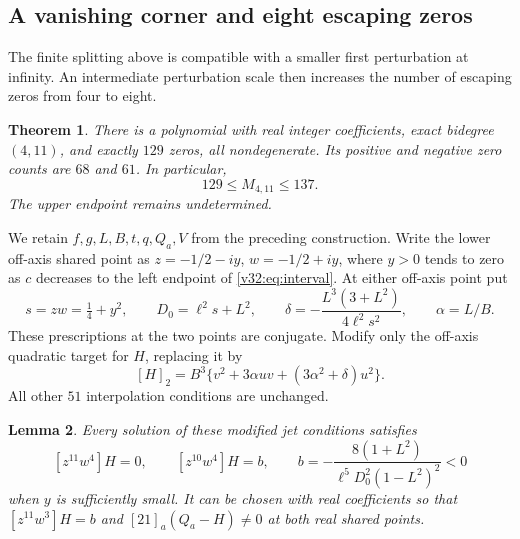 \documentclass[UTF8,11pt]{ctexart}
\newtheorem{thm}{Theorem}[section]
\newtheorem{lem}[thm]{Lemma}
\theoremstyle{definition}
\numberwithin{equation}{section}
\begin{document}
\subsection{A vanishing corner and eight escaping zeros}
\label{v33:sec:129}

The finite splitting above is compatible with a smaller first
perturbation at infinity. An intermediate perturbation scale then
increases the number of escaping zeros from four to eight.

\begin{thm}\label{v33:thm:129}
There is a polynomial with real integer coefficients, exact
bidegree $(4,11)$, and exactly $129$ zeros, all nondegenerate.
Its positive and negative zero counts are $68$ and $61$.
In particular,
\begin{equation}\label{v33:eq:bound}
 129\le M_{4,11}\le137.
\end{equation}
The upper endpoint remains undetermined.
\end{thm}

We retain $f,g,L,B,t,q,Q_a,V$ from the preceding construction.
Write the lower off-axis shared point as
$z=-1/2-iy$, $w=-1/2+iy$, where $y>0$ tends to zero as $c$
decreases to the left endpoint of \eqref{v32:eq:interval}.
At either off-axis point put
\begin{equation}\label{v33:eq:delta}
 s=zw=\tfrac14+y^2,\qquad
 D_0=\ell^2s+L^2,\qquad
 \delta=-\frac{L^3(3+L^2)}{4\ell^2s^2},\qquad
 \alpha=L/B.
\end{equation}
These prescriptions at the two points are conjugate.
Modify only the off-axis quadratic target for $H$, replacing it by
\begin{equation}\label{v33:eq:modifiedjet}
 [H]_2=B^3\{v^2+3\alpha uv+(3\alpha^2+\delta)u^2\}.
\end{equation}
All other $51$ interpolation conditions are unchanged.

\begin{lem}\label{v33:lem:corner}
Every solution of these modified jet conditions satisfies
\[
 [z^{11}w^4]H=0,\qquad [z^{10}w^4]H=b,
 \qquad
 b=-\frac{8(1+L^2)}{\ell^5D_0^2(1-L^2)^2}<0
\]
when $y$ is sufficiently small. It can be chosen with real
coefficients so that $[z^{11}w^3]H=b$ and
$[21]_a(Q_a-H)\ne0$ at both real shared points.
\end{lem}
\end{document}
